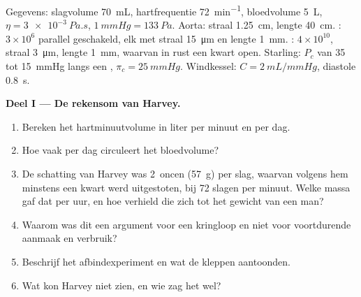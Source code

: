 \begin{problem}
\label{pb:b2:blood-circulation:1}
Gegevens: slagvolume \qty{70}{mL}, hartfrequentie \qty{72}{min^{-1}},
bloedvolume \qty{5}{L}, $\eta = \qty{3e-3}{Pa.s}$, $\qty{1}{mmHg} =
\qty{133}{Pa}$. Aorta: straal \qty{1.25}{cm}, lengte \qty{40}{cm}.
: $3\times 10^{6}$ parallel geschakeld, elk met straal
\qty{15}{\micro m} en lengte \qty{1}{mm}. : $4\times
10^{10}$, straal \qty{3}{\micro m}, lengte \qty{1}{mm}, waarvan in rust een
kwart open. Starling: $P_c$ van 35 tot \qty{15}{mmHg} langs een ,
$\pi_c = \qty{25}{mmHg}$. Windkessel: $C =
\qty{2}{mL/mmHg}$, diastole \qty{0.8}{s}.

\medskip
\noindent\textbf{Deel I --- De rekensom van Harvey.}
\begin{enumerate}
  \item Bereken het hartminuutvolume in liter per minuut en per dag.
  \item Hoe vaak per dag circuleert het bloedvolume?
  \item De schatting van Harvey was 2~oncen (\qty{57}{g}) per slag, waarvan
        volgens hem minstens een kwart werd uitgestoten, bij 72 slagen per
        minuut. Welke massa  gaf dat per uur, en hoe verhield die zich
        tot het gewicht van een man?
  \item Waarom was dit een argument voor een kringloop en niet voor
        voortdurende aanmaak en verbruik?
  \item Beschrijf het afbindexperiment en wat de kleppen aantoonden.
  \item Wat kon Harvey niet zien, en wie zag het wel?
\end{enumerate}


\end{problem}
